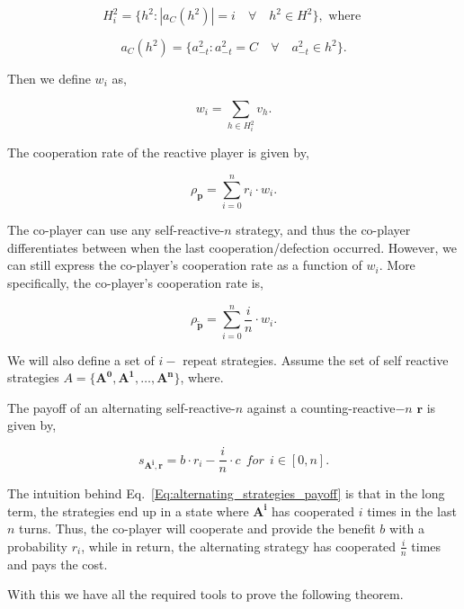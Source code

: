 \documentclass{article}
\theoremstyle{definition}
\begin{document}
$$
H^2_{i} = \{h^2 : |a_{C}(h^2)| = i \quad \forall \quad h^2 \in H^2\}, \text{ where }
$$

$$
a_{C}(h^2) = \{a^2_{-t} : a^2_{-t} = C \quad \forall \quad a^2_{-t} \in h^2\}.
$$

Then we define $w_i$ as,

$$
w_{i} = {\sum_{h \in H^2_{i}} v_{h}}.
$$

The cooperation rate of the reactive player is given by,

\begin{equation}\label{Eq:player_cooperation_counting}
  \rho_{\mathbf{p}} = \sum_{i=0}^{n} r_{i} \cdot w_{i}.
\end{equation}

The co-player can use any self-reactive-$n$ strategy, and thus the co-player
differentiates between when the last cooperation/defection occurred. However,
we can still express the co-player's cooperation rate as a function of $w_{i}$.
More specifically, the co-player's cooperation rate is,

\begin{equation}\label{Eq:coplayer_cooperation_counting}
  \rho_{\mathbf{\tilde{p}}} = \sum_{i=0}^{n} \frac{i}{n} \cdot w_{i}.
\end{equation}

We will also define a set of $i-$ repeat strategies. Assume the set of self
reactive strategies $A = \{\mathbf{A^{0}}, \mathbf{A^{1}}, \dots,
\mathbf{A^{n}} \}$, where.

The payoff of an alternating self-reactive-$n$ against a counting-reactive$-n$
$\mathbf{r}$ is given by,

\begin{equation}\label{Eq:alternating_strategies_payoff}
  s_{\mathbf{A^{i}}, \mathbf{r}} = b \cdot r_i - \frac{i}{n} \cdot c ~~for~~ i \in [0, n].
\end{equation}

The intuition behind  Eq.~\eqref{Eq:alternating_strategies_payoff} is that in
the long term, the strategies end up in a state where $\mathbf{A^{i}}$ has cooperated $i$ times
in the last $n$ turns. Thus, the co-player will cooperate and provide the benefit
$b$ with a probability $r_i$, while in return, the alternating strategy has
cooperated $\frac{i}{n}$ times and pays the cost.

With this we have all the required tools to prove the following theorem.
\end{document}

